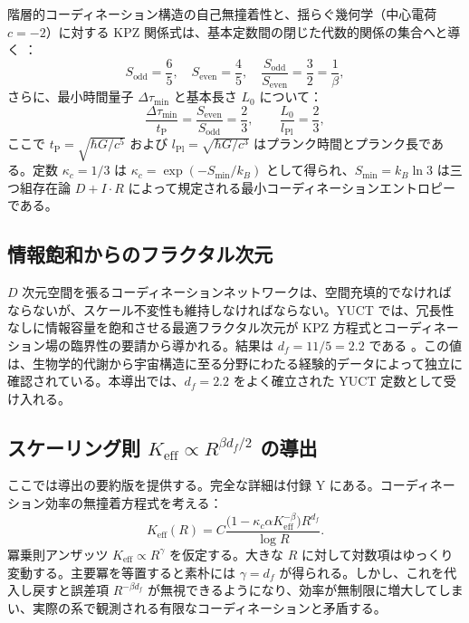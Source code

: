 \documentclass[11pt,a4paper]{article}
\newcommand{\kappac}{\kappa_c}
\newcommand{\Keff}{K_{\mathrm{eff}}}
\newcommand{\betaf}{\beta}
\newcommand{\Lpl}{l_{\mathrm{Pl}}}
\newcommand{\tP}{t_{\mathrm{P}}}
\newcommand{\Sodd}{S_{\mathrm{odd}}}
\newcommand{\Seven}{S_{\mathrm{even}}}
\newcommand{\Dtau}{\Delta\tau_{\min}}
\newcommand{\Lzero}{L_0}
\begin{document}
	階層的コーディネーション構造の自己無撞着性と、揺らぐ幾何学（中心電荷 \(c=-2\)）に対する KPZ 関係式は、基本定数間の閉じた代数的関係の集合へと導く \cite{AppendixY}：
	\begin{equation}
		\Sodd = \frac{6}{5},\quad \Seven = \frac{4}{5},\quad \frac{\Sodd}{\Seven} = \frac{3}{2} = \frac{1}{\betaf},
	\end{equation}
	さらに、最小時間量子 \(\Dtau\) と基本長さ \(\Lzero\) について：
	\begin{equation}
		\frac{\Dtau}{\tP} = \frac{\Seven}{\Sodd} = \frac{2}{3}, \qquad \frac{\Lzero}{\Lpl} = \frac{2}{3},
		\label{eq:algebraic-loop}
	\end{equation}
	ここで \(\tP = \sqrt{\hbar G / c^5}\) および \(\Lpl = \sqrt{\hbar G / c^3}\) はプランク時間とプランク長である。定数 \(\kappac = 1/3\) は \(\kappac = \exp(-S_{\min}/k_B)\) として得られ、\(S_{\min} = k_B \ln 3\) は三つ組存在論 \(D + I \cdot R\) によって規定される最小コーディネーションエントロピーである。
	
	\subsection{情報飽和からのフラクタル次元}
	
	\(D\) 次元空間を張るコーディネーションネットワークは、空間充填的でなければならないが、スケール不変性も維持しなければならない。YUCT では、冗長性なしに情報容量を飽和させる最適フラクタル次元が KPZ 方程式とコーディネーション場の臨界性の要請から導かれる。結果は \(d_f = 11/5 = 2.2\) である \cite{AppendixL}。この値は、生物学的代謝から宇宙構造に至る分野にわたる経験的データによって独立に確認されている。本導出では、\(d_f = 2.2\) をよく確立された YUCT 定数として受け入れる。
	
	\subsection{スケーリング則 \(\Keff \propto R^{\beta d_f/2}\) の導出}
	
	ここでは導出の要約版を提供する。完全な詳細は付録 Y にある。コーディネーション効率の無撞着方程式を考える：
	\begin{equation}
		\Keff(R) = C \frac{\bigl(1 - \kappac \alpha \Keff^{-\betaf}\bigr) R^{d_f}}{\log R}.
		\label{eq:consistency}
	\end{equation}
	冪乗則アンザッツ \(\Keff \propto R^{\gamma}\) を仮定する。大きな \(R\) に対して対数項はゆっくり変動する。主要冪を等置すると素朴には \(\gamma = d_f\) が得られる。しかし、これを代入し戻すと誤差項 \(R^{-\beta d_f}\) が無視できるようになり、効率が無制限に増大してしまい、実際の系で観測される有限なコーディネーションと矛盾する。
	
\end{document}
